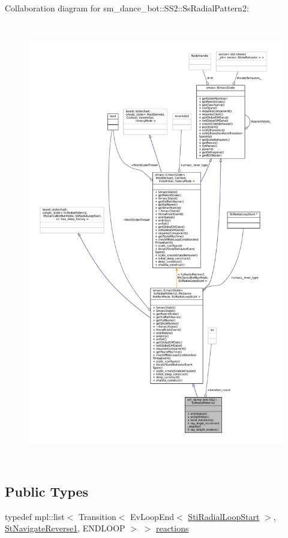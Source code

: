 Collaboration diagram for sm\+\_\+dance\+\_\+bot\+:\+:S\+S2\+:\+:Ss\+Radial\+Pattern2\+:
\nopagebreak
\begin{figure}[H]
\begin{center}
\leavevmode
\includegraphics[height=550pt]{structsm__dance__bot_1_1SS2_1_1SsRadialPattern2__coll__graph}
\end{center}
\end{figure}
\subsection*{Public Types}
\begin{DoxyCompactItemize}
\item 
typedef mpl\+::list$<$ Transition$<$ Ev\+Loop\+End$<$ \hyperlink{structsm__dance__bot_1_1radial__motion__states_1_1StiRadialLoopStart}{Sti\+Radial\+Loop\+Start} $>$, \hyperlink{structsm__dance__bot_1_1StNavigateReverse1}{St\+Navigate\+Reverse1}, E\+N\+D\+L\+O\+OP $>$ $>$ \hyperlink{structsm__dance__bot_1_1SS2_1_1SsRadialPattern2_a7261ff8f65fa5a0bb062ad6c24f40225}{reactions}
\end{DoxyCompactItemize}
